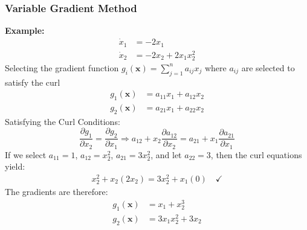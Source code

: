 \documentclass[11pt,handout]{beamer}   %
\begin{document}
\begin{frame}
\frametitle{Variable Gradient Method}
\small
\textbf{Example:}
\begin{equation*}
\begin{aligned}
\dot{x}_1 &= -2 x_1\\
\dot{x}_2 &= -2 x_2 + 2x_1 x_2 ^2
\end{aligned}
\end{equation*}
Selecting the gradient function $g_i(\mathbf{x}) = \sum_{j = 1}^{n} a_{ij} x_j$ where $a_{ij}$ are selected to satisfy the curl
\begin{equation*}
\begin{aligned}
g_1(\mathbf{x}) &= a_{11} x_1 + a_{12} x_2\\
g_2(\mathbf{x}) &= a_{21} x_1 + a_{22} x_2
\end{aligned}
\end{equation*}
Satisfying the Curl Conditions:
\begin{equation*}
\frac{\partial g_1}{\partial x_2} = \frac{\partial g_2}{\partial x_1} \Rightarrow a_{12} + x_2 \frac{\partial a_{12}}{\partial x_2} = a_{21} +  x_1 \frac{\partial a_{21}}{\partial x_1} 
\end{equation*}
If we select $a_{11} = 1$, $a_{12} = x_2^2$,  $a_{21} = 3x_2^2$, and let $a_{22} = 3$, then the curl equations yield:
\begin{equation*}
\begin{aligned}
x_2^2 + x_2(2 x_2) = 3 x_2^2 + x_1(0) \quad \checkmark
\end{aligned}
\end{equation*}
The gradients are therefore:
\begin{equation*}
\begin{aligned}
g_1(\mathbf{x}) &= x_1 + x_2^3\\
g_2(\mathbf{x}) &= 3x_1 x_2^2 + 3x_2
\end{aligned}
\end{equation*}
\end{frame}
\end{document}
